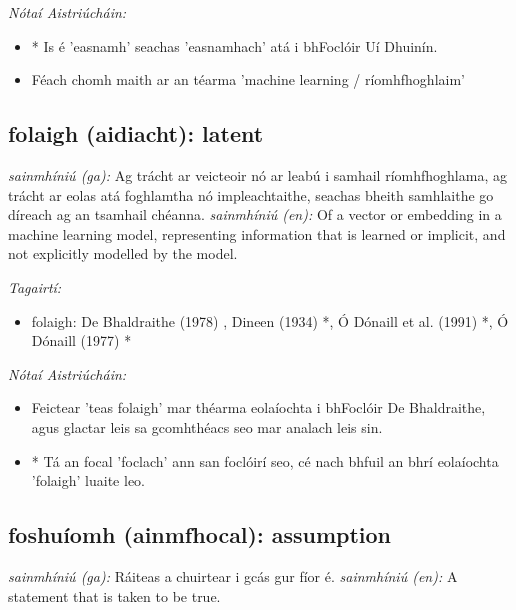 \documentclass{article}
\begin{document}
 \noindent \textit{Nótaí Aistriúcháin:}
\begin{itemize}
	\item * Is é 'easnamh' seachas 'easnamhach' atá i bhFoclóir Uí Dhuinín.
	\item Féach chomh maith ar an téarma 'machine learning / ríomhfhoghlaim'
\end{itemize}


\subsection*{folaigh (aidiacht): latent} 
 \noindent \textit{sainmhíniú (ga):} Ag trácht ar veicteoir nó ar leabú i samhail ríomhfhoghlama, ag trácht ar eolas atá foghlamtha nó impleachtaithe, seachas bheith samhlaithe go díreach ag an tsamhail chéanna.
\newline\newline
 \noindent \textit{sainmhíniú (en):} Of a vector or embedding in a machine learning model, representing information that is learned or implicit, and not explicitly modelled by the model.
\newline

 \noindent \textit{Tagairtí:}
\begin{itemize}
	\item folaigh: De Bhaldraithe (1978) \cite{de-bhaldraithe}, Dineen (1934) \cite{dineen}*, Ó Dónaill et al. (1991) \cite{focloir-beag}*, Ó Dónaill (1977) \cite{odonaill}*
\end{itemize}

 \noindent \textit{Nótaí Aistriúcháin:}
\begin{itemize}
	\item Feictear 'teas folaigh' mar théarma eolaíochta i bhFoclóir De Bhaldraithe, agus glactar leis sa gcomhthéacs seo mar analach leis sin.
	\item * Tá an focal 'foclach' ann san foclóirí seo, cé nach bhfuil an bhrí eolaíochta 'folaigh' luaite leo.
\end{itemize}


\subsection*{foshuíomh (ainmfhocal): assumption} 
 \noindent \textit{sainmhíniú (ga):} Ráiteas a chuirtear i gcás gur fíor é.
\newline\newline
 \noindent \textit{sainmhíniú (en):} A statement that is taken to be true.
\newline
\end{document}
